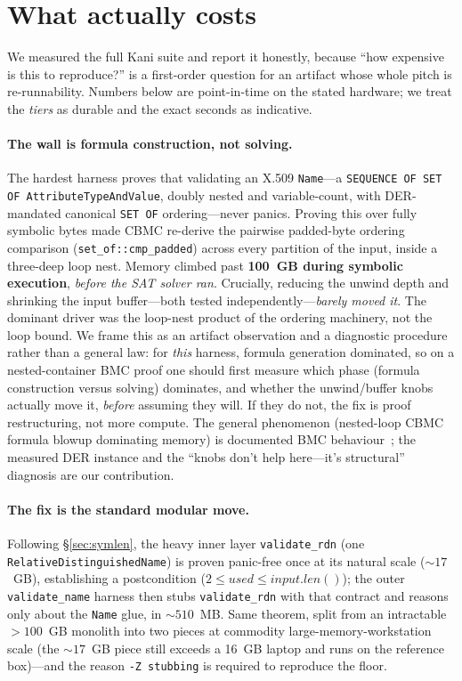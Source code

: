 \documentclass[10pt,twocolumn]{article}
\newcommand{\code}[1]{\texttt{\small #1}}
\begin{document}
\section{What actually costs}
\label{sec:cost}

We measured the full Kani suite and report it honestly, because ``how
expensive is this to reproduce?'' is a first-order question for an artifact
whose whole pitch is re-runnability. Numbers below are point-in-time on the
stated hardware; we treat the \emph{tiers} as durable and the exact seconds as
indicative.

\paragraph{The wall is formula construction, not solving.}
\label{sec:wall}
The hardest harness proves that validating an X.509 \code{Name}---a
\code{SEQUENCE OF SET OF AttributeTypeAndValue}, doubly nested and
variable-count, with DER-mandated canonical \code{SET OF} ordering---never
panics. Proving this over fully symbolic bytes made CBMC re-derive the
pairwise padded-byte ordering comparison (\code{set\_of::cmp\_padded}) across
every partition of the input, inside a three-deep loop nest. Memory climbed past
\textbf{100~GB during symbolic execution}, \emph{before the SAT solver ran}.
Crucially, reducing the unwind depth and shrinking the input buffer---both
tested independently---\emph{barely moved it}. The dominant driver was the
loop-nest product of the ordering machinery, not the loop bound. We frame this
as an artifact observation and a diagnostic procedure rather than a general law:
for \emph{this} harness, formula generation dominated, so on a nested-container
BMC proof one should first measure which phase (formula construction versus
solving) dominates, and whether the unwind/buffer knobs actually move it,
\emph{before} assuming they will. If they do not, the fix is proof
restructuring, not more compute. The general phenomenon (nested-loop CBMC
formula blowup dominating memory) is documented BMC behaviour~\cite{cbmcpath};
the measured DER instance and the ``knobs don't help here---it's structural''
diagnosis are our contribution.

\paragraph{The fix is the standard modular move.}
Following \S\ref{sec:symlen}, the heavy inner layer \code{validate\_rdn}
(one \code{RelativeDistinguishedName}) is proven panic-free once at its natural
scale (${\sim}17$~GB), establishing a postcondition
($2 \le \mathit{used} \le \mathit{input.len()}$); the outer
\code{validate\_name} harness then stubs \code{validate\_rdn} with that
contract and reasons only about the \code{Name} glue, in ${\sim}510$~MB. Same
theorem, split from an intractable ${>}100$~GB monolith into two pieces at
commodity large-memory-workstation scale (the ${\sim}17$~GB piece still exceeds
a 16~GB laptop and runs on the reference box)---and the reason \code{-Z stubbing}
is required to reproduce the floor.
\end{document}
